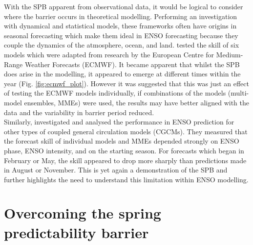 \documentclass[12pt, onecolumn]{revtex4}    %
\begin{document}
With the SPB apparent from observational data, it would be logical to consider where the barrier occurs in theoretical modelling. Performing an investigation with dynamical and statistical models, these frameworks often have origins in seasonal forecasting which make them ideal in ENSO forecasting because they couple the dynamics of the atmosphere, ocean, and land. \cite{jan2005did} tested the skill of six models which were adapted from research by the European Centre for Medium-Range Weather Forecasts (ECMWF). It became apparent that whilst the SPB does arise in the modelling, it appeared to emerge at different times within the year (Fig. \ref{fig:ecmwf_plot}). However it was suggested that this was just an effect of testing the ECMWF models individually, if combinations of the models (multi-model ensembles, MMEs) were used, the results may have better aligned with the data and the variability in barrier period reduced. \\

Similarly, \cite{jin2008current} investigated and analysed the performance in ENSO prediction for other types of coupled general circulation models (CGCMs). They measured that the forecast skill of individual models and MMEs depended strongly on ENSO phase, ENSO intensity, and on the starting season. For forecasts which began in February or May, the skill appeared to drop more sharply than predictions made in August or November. This is yet again a demonstration of the SPB and further highlights the need to understand this limitation within ENSO modelling.

\section{Overcoming the spring predictability barrier}
\end{document}
